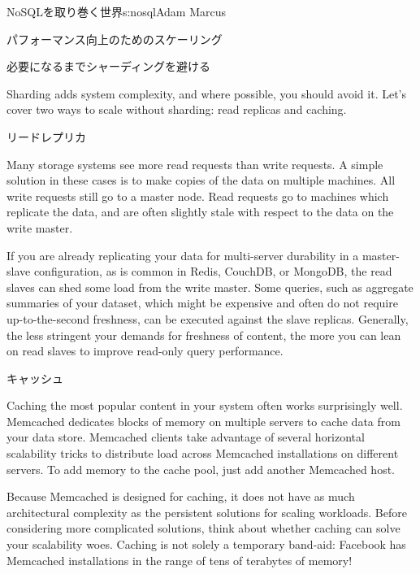 \begin{aosachapter}{NoSQLを取り巻く世界}{s:nosql}{Adam Marcus}
\begin{aosasect1}{パフォーマンス向上のためのスケーリング}
\begin{aosasect2}{必要になるまでシャーディングを避ける}

Sharding adds system complexity, and where possible, you should avoid
it.  Let's cover two ways to scale without sharding: read replicas and
caching.

\begin{aosasect3}{リードレプリカ}

Many storage systems see more read requests than write requests.  A
simple solution in these cases is to make copies of the data on
multiple machines.  All write requests still go to a master node.
Read requests go to machines which replicate the data, and are often
slightly stale with respect to the data on the write master.

If you are already replicating your data for multi-server durability
in a master-slave configuration, as is common in Redis, CouchDB, or
MongoDB, the read slaves can shed some load from the write master.
Some queries, such as aggregate summaries of your dataset, which might
be expensive and often do not require up-to-the-second freshness, can
be executed against the slave replicas.  Generally, the less stringent
your demands for freshness of content, the more you can lean on read
slaves to improve read-only query performance.

\end{aosasect3}

\begin{aosasect3}{キャッシュ}

Caching the most popular content in your system often works
surprisingly well.  Memcached dedicates blocks of memory on multiple
servers to cache data from your data store.  Memcached clients take
advantage of several horizontal scalability tricks to distribute load
across Memcached installations on different servers.  To add memory to
the cache pool, just add another Memcached host.

Because Memcached is designed for caching, it does not have as much
architectural complexity as the persistent solutions for scaling
workloads.  Before considering more complicated solutions, think about
whether caching can solve your scalability woes.  Caching is not solely
a temporary band-aid: Facebook has Memcached installations in the range
of tens of terabytes of memory!


\end{aosasect3}
\end{aosasect2}
\end{aosasect1}
\end{aosachapter}
